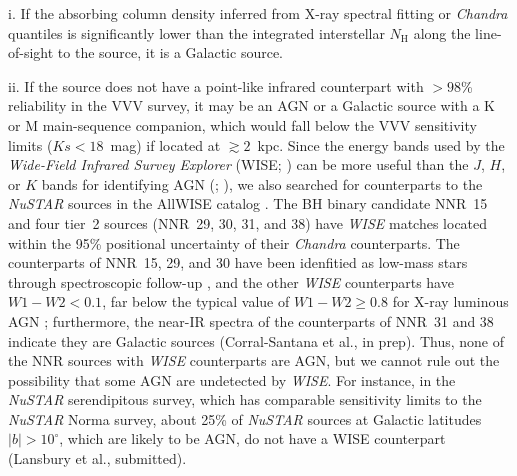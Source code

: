 \documentclass[iop,revtex4]{emulateapj}
\begin{document}
\begin{list}{}{%
\setlength{\topsep}{0pt}%
\setlength{\leftmargin}{0.3in}%
\setlength{\listparindent}{0.0in}%
\setlength{\itemindent}{0.0in}%
\setlength{\parsep}{\parskip}%
\setlength{\itemsep}{4pt}
}%
\item[]
i.  If the absorbing column density inferred from X-ray spectral fitting or \textit{Chandra} quantiles is significantly lower than the integrated interstellar $N_{\mathrm{H}}$ along the line-of-sight to the source, it is a Galactic source.  
\item[]
ii. If the source does not have a point-like infrared counterpart with $>98$\% reliability in the VVV survey, it may be an AGN or a Galactic source with a K or M main-sequence companion, which would fall below the VVV sensitivity limits ($Ks<18$~mag) if located at $\gtrsim2$~kpc.  Since the energy bands used by the \textit{Wide-Field Infrared Survey Explorer} (WISE; \citealt{wright10}) can be more useful than the $J$, $H$, or $K$ bands for identifying AGN (\citealt{stern12}; \citealt{mateos12}), we also searched for counterparts to the \textit{NuSTAR} sources in the AllWISE catalog \citep{cutri13}.  The BH binary candidate NNR~15 and four tier~2 sources (NNR~29, 30, 31, and 38) have \textit{WISE} matches located within the 95\% positional uncertainty of their \textit{Chandra} counterparts.  The counterparts of NNR~15, 29, and 30 have been idenfitied as low-mass stars through spectroscopic follow-up \citep{rahoui14}, and the other \textit{WISE} counterparts have $W1-W2<0.1$, far below the typical value of $W1-W2\geq0.8$ for X-ray luminous AGN \citep{stern12}; furthermore, the near-IR spectra of the counterparts of NNR~31 and 38 indicate they are Galactic sources (Corral-Santana et al., in prep).  Thus, none of the NNR sources with \textit{WISE} counterparts are AGN, but we cannot rule out the possibility that some AGN are undetected by \textit{WISE}.  For instance, in the \textit{NuSTAR} serendipitous survey, which has comparable sensitivity limits to the \textit{NuSTAR} Norma survey, about 25\% of \textit{NuSTAR} sources at Galactic latitudes $|b|>10^{\circ}$, which are likely to be AGN, do not have a WISE counterpart (Lansbury et al., submitted).    
\item[]

\end{list}
\end{document}
